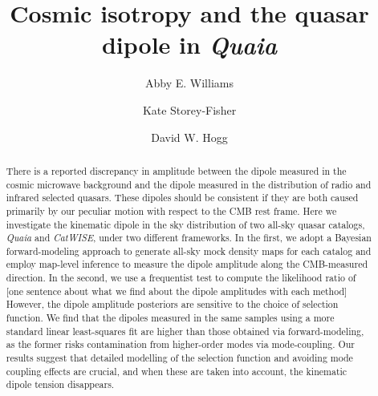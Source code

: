 \documentclass[modern]{aastex631}
\newcommand{\catwise}{\textsl{CatWISE}\xspace}
\newcommand{\quaia}{\textsl{Quaia}\xspace}
\begin{document}
\title{Cosmic isotropy and the quasar dipole in \textsl{Quaia}}
\author[0000-0001-6069-5383]{Abby E. Williams}

\author[0000-0001-8764-7103]{Kate Storey-Fisher}

\author[0000-0003-2866-9403]{David W. Hogg}

\begin{abstract}\noindent
    There is a reported discrepancy in amplitude between the dipole measured in the cosmic microwave background and the dipole measured in the distribution of radio and infrared selected quasars.
    These dipoles should be consistent if they are both caused primarily by our peculiar motion with respect to the CMB rest frame.
    Here we investigate the kinematic dipole in the sky distribution of two all-sky quasar catalogs, \quaia and \catwise, under two different frameworks.
    In the first, we adopt a Bayesian forward-modeling approach to generate all-sky mock density maps for each catalog and employ map-level inference to measure the dipole amplitude along the CMB-measured direction.
    In the second, we use a frequentist test to compute the likelihood ratio of 
    [one sentence about what we find about the dipole amplitudes with each method]
    However, the dipole amplitude posteriors are sensitive to the choice of selection function.
    We find that the dipoles measured in the same samples using a more standard linear least-squares fit are higher than those obtained via forward-modeling, as the former risks contamination from higher-order modes via mode-coupling.
    Our results suggest that detailed modelling of the selection function and avoiding mode coupling effects are crucial, and when these are taken into account, the kinematic dipole tension disappears.
\end{abstract}
\end{document}
